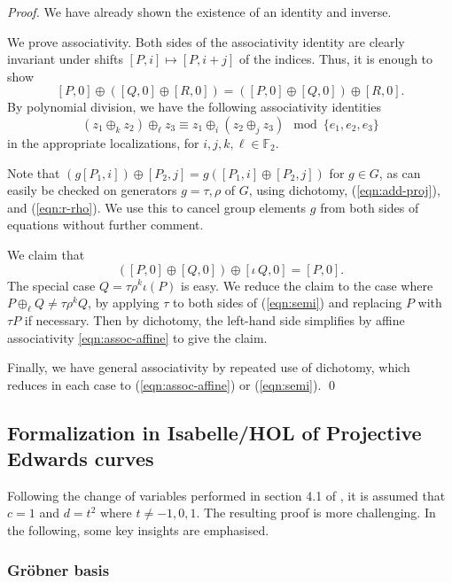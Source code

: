 \documentclass{llncs}
\newcommand{\ring}[1]{\mathbb{#1}}
\begin{document}
\begin{proof} We have already shown the existence of an identity and
  inverse.

  We prove associativity.  Both sides of the associativity identity
  are clearly invariant under shifts $[P,i]\mapsto [P,i+j]$ of the
  indices.  Thus, it is enough to show
\[
[P,0] \oplus ([Q,0]\oplus [R,0]) = ([P,0]\oplus [Q,0])\oplus [R,0].
\]
By polynomial division, we have the following associativity identities
\begin{equation}\label{eqn:assoc-affine}
 (z_1\oplus_k z_2)\oplus_\ell z_3 \equiv z_1 
\oplus_i (z_2\oplus_j z_3) \mod \{e_1,e_2,e_3\}
\end{equation}
in the appropriate localizations, for $i,j,k,\ell\in \ring{F}_2$.

Note that $(g [P_1,i])\oplus [P_2,j] = g([P_1,i]\oplus [P_2,j])$ for
$g\in G$, as can easily be checked on generators $g=\tau,\rho$ of $G$,
using dichotomy, (\ref{eqn:add-proj}), and (\ref{eqn:r-rho}).  We use
this to cancel group elements $g$ from both sides of equations without
further comment.

We claim that
\begin{equation}\label{eqn:semi}
([P,0]\oplus [Q,0])\oplus [\iota\,Q,0] = [P,0].
\end{equation}
The special case $Q= \tau\rho^k \iota(P)$ is easy. We reduce the claim
to the case where $P\oplus_\ell Q\ne \tau\rho^k Q$, by applying $\tau$
to both sides of (\ref{eqn:semi}) and replacing $P$ with $\tau P$ if
necessary.  Then by dichotomy, the left-hand side simplifies by affine
associativity \ref{eqn:assoc-affine} to give the claim.

Finally, we have general associativity by repeated use of dichotomy,
which reduces in each case to (\ref{eqn:assoc-affine}) or
(\ref{eqn:semi}).
\qed\end{proof}

\subsection{Formalization in Isabelle/HOL of Projective Edwards curves}

Following the change of variables performed in section 4.1 of
\cite{hales2016group}, it is assumed that $c = 1$ and $d = t^2$ where
$t \neq -1,0,1$. The resulting proof is more challenging. In the
following, some key insights are emphasised.

\subsubsection{Gr\"{o}bner basis}
\end{document}
